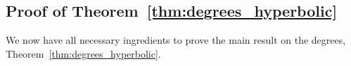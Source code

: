 %
%

\subsection{Proof of Theorem~\ref{thm:degrees_hyperbolic}}\label{ssec:proof_thm_degrees}

We now have all necessary ingredients to prove the main result on the degrees, Theorem~\ref{thm:degrees_hyperbolic}.

